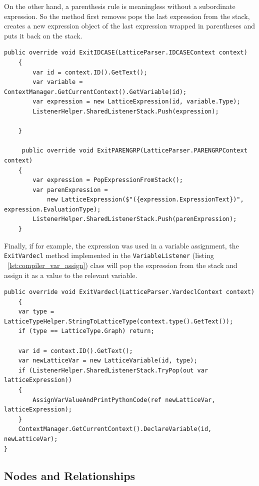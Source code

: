 On the other hand, a parenthesis rule is meaningless without a subordinate expression.
So the method first removes pops the last expression from the stack,
creates a new expression object of the last expression wrapped in parentheses and puts it back on the stack.

\begin{lstlisting}[caption={ExpressionListener class excerpt},captionpos=b, label={lst:expression_listener_excerpt}]
    public override void ExitIDCASE(LatticeParser.IDCASEContext context)
    {
        var id = context.ID().GetText();
        var variable = ContextManager.GetCurrentContext().GetVariable(id);
        var expression = new LatticeExpression(id, variable.Type);
        ListenerHelper.SharedListenerStack.Push(expression);

    }

     public override void ExitPARENGRP(LatticeParser.PARENGRPContext context)
    {
        var expression = PopExpressionFromStack();
        var parenExpression =
            new LatticeExpression($"({expression.ExpressionText})", expression.EvaluationType);
        ListenerHelper.SharedListenerStack.Push(parenExpression);
    }
\end{lstlisting}

Finally, if for example, the expression was used in a variable assignment, the \lstinline{ExitVardecl} method
implemented in the \lstinline{VariableListener} (listing ~\ref{lst:compiler_var_assign}) class will pop the expression from the stack and assign it
as a value to the relevant variable.

\begin{lstlisting}[caption={VariableListener class excerpt},captionpos=b, label={lst:compiler_var_assign}]
    public override void ExitVardecl(LatticeParser.VardeclContext context)
    {
    var type = LatticeTypeHelper.StringToLatticeType(context.type().GetText());
    if (type == LatticeType.Graph) return;

    var id = context.ID().GetText();
    var newLatticeVar = new LatticeVariable(id, type);
    if (ListenerHelper.SharedListenerStack.TryPop(out var latticeExpression))
    {
        AssignVarValueAndPrintPythonCode(ref newLatticeVar, latticeExpression);
    }
    ContextManager.GetCurrentContext().DeclareVariable(id, newLatticeVar);
}
\end{lstlisting}

\subsection{Nodes and Relationships} \label{subsec:nodes_and_relationships}

